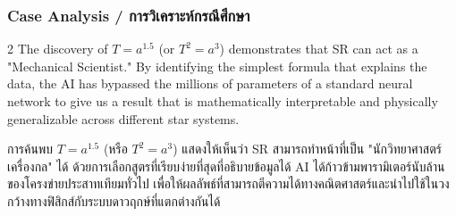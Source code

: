 \subsubsection*{Case Analysis \quad / \quad \textthai{การวิเคราะห์กรณีศึกษา}}
\begin{paracol}{2}
The discovery of $T = a^{1.5}$ (or $T^2 = a^3$) demonstrates that SR can act as a "Mechanical Scientist." By identifying the simplest formula that explains the data, the AI has bypassed the millions of parameters of a standard neural network to give us a result that is mathematically interpretable and physically generalizable across different star systems.

\switchcolumn

\begin{thai}
การค้นพบ $T = a^{1.5}$ (หรือ $T^2 = a^3$) แสดงให้เห็นว่า SR สามารถทำหน้าที่เป็น "นักวิทยาศาสตร์เครื่องกล" ได้ ด้วยการเลือกสูตรที่เรียบง่ายที่สุดที่อธิบายข้อมูลได้ AI ได้ก้าวข้ามพารามิเตอร์นับล้านของโครงข่ายประสาทเทียมทั่วไป เพื่อให้ผลลัพธ์ที่สามารถตีความได้ทางคณิตศาสตร์และนำไปใช้ในวงกว้างทางฟิสิกส์กับระบบดาวฤกษ์ที่แตกต่างกันได้
\end{thai}
\end{paracol}

